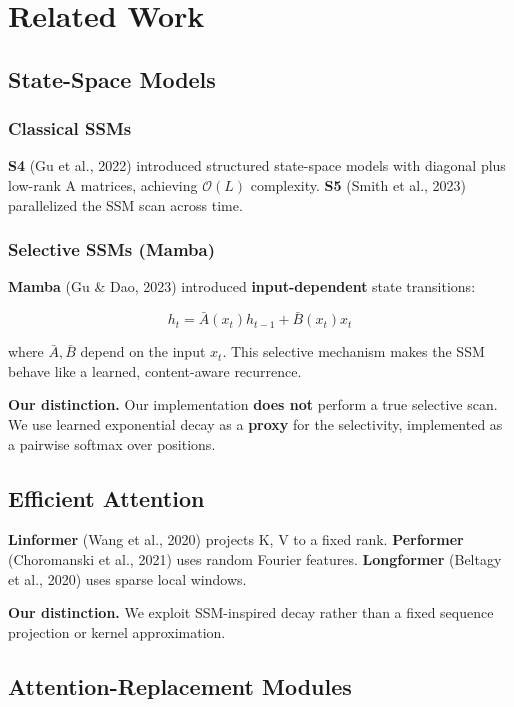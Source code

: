 \section{Related Work}

\subsection{State-Space Models}

\subsubsection{Classical SSMs}

\textbf{S4} (Gu et al., 2022) introduced structured state-space models with 
diagonal plus low-rank A matrices, achieving $\mathcal{O}(L)$ complexity. 
\textbf{S5} (Smith et al., 2023) parallelized the SSM scan across time.

\subsubsection{Selective SSMs (Mamba)}

\textbf{Mamba} (Gu \& Dao, 2023) introduced \textbf{input-dependent} state transitions:

\[
h_t = \bar{A}(x_t) h_{t-1} + \bar{B}(x_t) x_t
\tag{2.1}
\]

where $\bar{A}, \bar{B}$ depend on the input $x_t$. This selective mechanism 
makes the SSM behave like a learned, content-aware recurrence.

\textbf{Our distinction.} Our implementation \textbf{does not} perform a true selective 
scan. We use learned exponential decay as a \textbf{proxy} for the selectivity, 
implemented as a pairwise softmax over positions.

\subsection{Efficient Attention}

\textbf{Linformer} (Wang et al., 2020) projects K, V to a fixed rank. 
\textbf{Performer} (Choromanski et al., 2021) uses random Fourier features. 
\textbf{Longformer} (Beltagy et al., 2020) uses sparse local windows.

\textbf{Our distinction.} We exploit SSM-inspired decay rather than a fixed 
sequence projection or kernel approximation.

\subsection{Attention-Replacement Modules}

